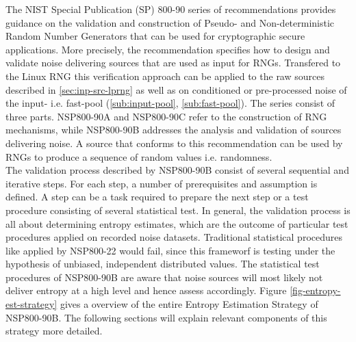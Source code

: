 The NIST Special Publication (SP) 800-90 series of recommendations provides 
guidance on the validation and construction of Pseudo- and Non-deterministic Random Number Generators that can be used for cryptographic secure applications. More precisely, the recommendation specifies how to design and validate noise delivering sources that are used as input for RNGs. Transfered to the Linux RNG this verification approach can be applied to the raw sources described in \ref{sec:inp-src-lprng} as well as on conditioned or pre-processed noise of the input- i.e. fast-pool (\ref{sub:input-pool}, \ref{sub:fast-pool}). The series consist of three parts. NSP800-90A and NSP800-90C refer to the construction of RNG mechanisms, while NSP800-90B addresses the analysis and validation of sources delivering noise. A source that conforms to this recommendation can be used by RNGs to produce a sequence of random values \cite{rukhin2010nist} i.e. randomness.\\
The validation process described by NSP800-90B consist of several sequential and iterative steps. For each step, a number of prerequisites and assumption is defined. A step can be a task required to prepare the next step or a test procedure consisting of several statistical test. In general, the validation process is all about determining entropy estimates, which are the outcome of particular test procedures applied on recorded noise datasets. Traditional statistical procedures like applied by NSP800-22 would fail, since this frameworf is testing under the hypothesis of unbiased, independent distributed values. The statistical test procedures of NSP800-90B are aware that noise sources will most likely not deliver entropy at a high level and hence assess accordingly. Figure \ref{fig-entropy-est-strategy} gives a overview of the entire Entropy Estimation Strategy of NSP800-90B. The following sections will explain relevant components of this strategy more detailed.


